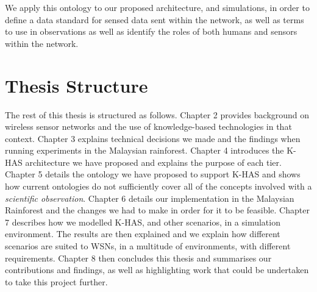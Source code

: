 We apply this ontology to our proposed architecture, and simulations, in order to define a data standard for sensed data sent within the network, as well as terms to use in observations as well as identify the roles of both humans and sensors within the network.


\section{Thesis Structure}
The rest of this thesis is structured as follows. Chapter 2 provides background on wireless sensor networks and the use of knowledge-based technologies in that context. Chapter 3 explains technical decisions we made and the findings when running experiments in the Malaysian rainforest. Chapter 4 introduces the K-HAS architecture we have proposed and explains the purpose of each tier. Chapter 5 details the ontology we have proposed to support K-HAS and shows how current ontologies do not sufficiently cover all of the concepts involved with a \textit{scientific observation}. Chapter 6 details our implementation in the Malaysian Rainforest and the changes we had to make in order for it to be feasible. Chapter 7 describes how we modelled K-HAS, and other scenarios, in a simulation environment. The results are then explained and we explain how different scenarios are suited to WSNs, in a multitude of environments, with different requirements. Chapter 8 then concludes this thesis and summarises our contributions and findings, as well as highlighting work that could be undertaken to take this project further.
